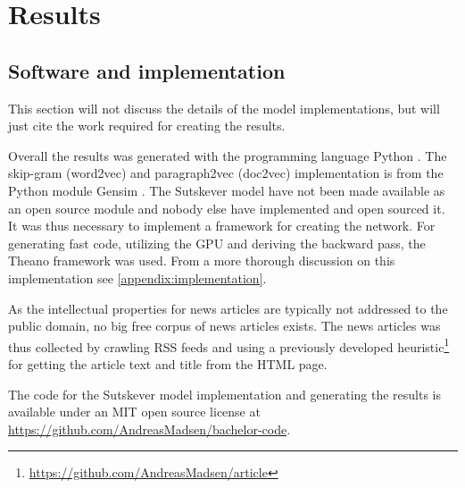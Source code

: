 \chapter{Results}

\section{Software and implementation}
This section will not discuss the details of the model implementations, but will just cite the work required for creating the results.

Overall the results was generated with the programming language Python \cite{python}. The skip-gram (word2vec) and paragraph2vec (doc2vec) implementation is from the Python module Gensim \cite{gensim}. The Sutskever model \cite{sutskever} have not been made available as an open source module and nobody else have implemented and open sourced it. It was thus necessary to implement a framework for creating the network. For generating fast code, utilizing the GPU and deriving the backward pass, the Theano framework \cite{theano-a, theano-b} was used. From a more thorough discussion on this implementation see \autoref{appendix:implementation}.

As the intellectual properties for news articles are typically not addressed to the public domain, no big free corpus of news articles exists. The news articles was thus collected by crawling RSS feeds and using a previously developed heuristic\footnote{\url{https://github.com/AndreasMadsen/article}} for getting the article text and title from the HTML page.

The code for the Sutskever model implementation and generating the results is available under an MIT open source license at \url{https://github.com/AndreasMadsen/bachelor-code}.

\clearpage

\clearpage

\clearpage

